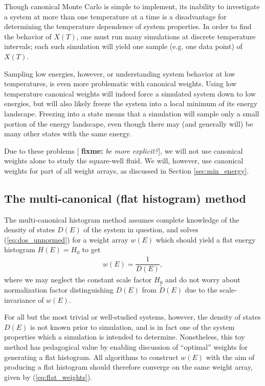 \documentclass[11pt]{article}
\newcommand{\f}[2]{\dfrac{#1}{#2}} %
\newcommand{\p}[1]{\left(#1\right)} %
\newcommand{\red}[1]{{\bf \color{red} #1}}
\newcommand{\fixme}[1]{[\red{fixme:} \emph{#1}]}
\begin{document}
Though canonical Monte Carlo is simple to implement, its inability to
investigate a system at more than one temperature at a time is a
disadvantage for determining the temperature dependence of system
properties. In order to find the behavior of $X\p{T}$, one must run
many simulations at discrete temperature intervals; each such
simulation will yield one sample (e.g. one data point) of $X\p{T}$.

Sampling low energies, however, or understanding system behavior at
low temperatures, is even more problematic with canonical
weights. Using low temperature canonical weights will indeed force a
simulated system down to low energies, but will also likely freeze the
system into a local minimum of its energy landscape. Freezing into a
state means that a simulation will sample only a small portion of the
energy landscape, even though there may (and generally will) be many
other states with the same energy.

Due to these problems \fixme{be more explicit?}, we will not use
canonical weights alone to study the square-well fluid. We will,
however, use canonical weights for part of all weight arrays, as
discussed in Section \ref{sec:min_energy}.

\subsection{The multi-canonical (flat histogram) method}
\label{sec:flat_historam}

The multi-canonical histogram method assumes complete knowledge of the
density of states $D\p E$ of the system in question, and solves
(\ref{eq:dos_unnormed}) for a weight array $w\p{E}$ which should yield
a flat energy histogram $H\p E=H_0$ to get
\begin{align}
  w\p E=\f1{D\p E},
  \label{eq:flat_weights}
\end{align}
where we may neglect the constant scale factor $H_0$ and do not worry
about normalization factor distinguishing $D\p{E}$ from $\tilde
D\p{E}$ due to the scale-invariance of $w\p{E}$.

For all but the most trivial or well-studied systems, however, the
density of states $D\p{E}$ is not known prior to simulation, and is in
fact one of the system properties which a simulation is intended to
determine. Nonetheless, this toy method has pedagogical value by
enabling discussion of ``optimal'' weights for generating a flat
histogram. All algorithms to construct $w\p{E}$ with the aim of
producing a flat histogram should therefore converge on the same
weight array, given by (\ref{eq:flat_weights}).
\end{document}
